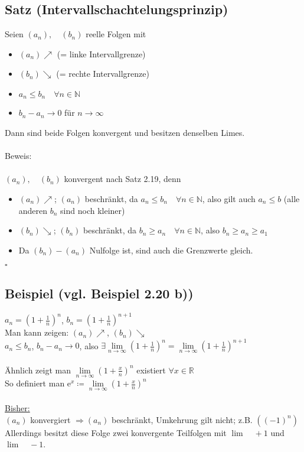 \documentclass[12pt, titlepage]{article}
\newcommand{\R}{\mathds{R}}
\newcommand{\N}{\mathds{N}}
\newcommand{\e}{\textrm{e}}
\newcommand{\infn}{n\rightarrow\infty}
\renewcommand{\>}{\rightarrow}
\renewcommand{\*}{\cdot}
\begin{document}
	\subsection{Satz (Intervallschachtelungsprinzip)}
	Seien $(a_n),\quad(b_n)$ reelle Folgen mit
	\begin{itemize}
		\item $(a_n)\nearrow$ (= linke Intervallgrenze)
		\item $(b_n)\searrow$ (= rechte Intervallgrenze)
		\item $a_n\leq b_n\quad\forall n\in\N$
		\item $b_n-a_n\> 0$ für $\infn$
	\end{itemize}
	Dann sind beide Folgen konvergent und besitzen denselben Limes.\\
	\\
	Beweis:\\
	\\
	$(a_n),\quad(b_n)$ konvergent nach Satz 2.19, denn
	\begin{itemize}
		\item $(a_n)\nearrow$; $(a_n)$ beschränkt, da $a_n\leq b_n\quad\forall n\in\N$, also gilt auch $a_n\leq b$ (alle anderen $b_n$ sind noch kleiner)
		\item $(b_n)\searrow$; $(b_n)$ beschränkt, da $b_n\geq a_n\quad\forall n\in\N$, also $b_n\geq a_n\geq a_1$
		\item Da $(b_n)-(a_n)$ Nulfolge ist, sind auch die Grenzwerte gleich.
	\end{itemize}\hfill$\square$
	\subsection{Beispiel (vgl. Beispiel 2.20 b))}
	$a_n=(1+\frac{1}{n})^n$, $b_n=(1+\frac{1}{n})^{n+1}$\\
	Man kann zeigen: $(a_n)\nearrow$, $(b_n)\searrow$\\
	$a_n\leq b_n$, $b_n-a_n\> 0$, also $\exists\lim\limits_{\infn}(1+\frac{1}{n})^n=\lim\limits_{\infn}(1+\frac{1}{n})^{n+1}$\\
	\\
	Ähnlich zeigt man $\lim\limits_{\infn}(1+\frac{x}{n})^n$ existiert $\forall x\in\R$\\
	So definiert man $\e^x\coloneqq\lim\limits_{\infn}(1+\frac{x}{n})^n$\\
	\\
	\underline{Bisher:}\\
	$(a_n)$ konvergiert $\Rightarrow (a_n)$ beschränkt, Umkehrung gilt nicht; z.B. $((-1)^n)$\\
	Allerdings besitzt diese Folge zwei konvergente Teilfolgen mit $\lim\quad+1$ und $\lim\quad-1$.
\end{document}
